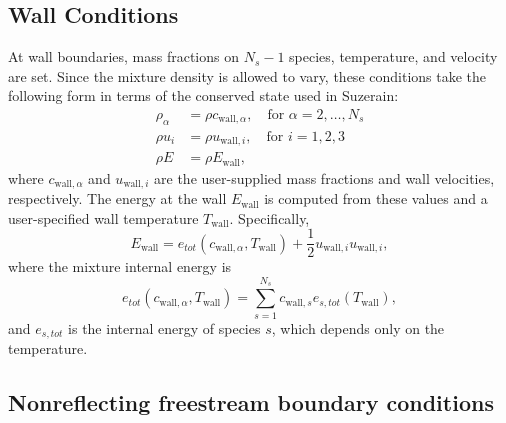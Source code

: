 

\subsection{Wall Conditions}
At wall boundaries, mass fractions on $N_s -1$ species, temperature,
and velocity are set.  Since the mixture density is allowed to vary,
these conditions take the following form in terms of the conserved
state used in Suzerain:
%
\begin{align*}
\rho_{\alpha} &= \rho c_{\mathrm{wall},\alpha}, \quad \mathrm{for} \,\, \alpha = 2, \ldots, N_s\\
\rho u_i &= \rho u_{\mathrm{wall},i}, \quad \mathrm{for} \,\, i = 1, 2, 3 \\
\rho E &= \rho E_{\mathrm{wall}},
\end{align*}
%
where $c_{\mathrm{wall},\alpha}$ and $u_{\mathrm{wall},i}$ are the user-supplied
mass fractions and wall velocities, respectively.  The energy at the
wall $E_{\mathrm{wall}}$ is computed from these values and a
user-specified wall temperature $T_{\mathrm{wall}}$.  Specifically,
%
\begin{equation*}
E_{\mathrm{wall}} = e_{tot}(c_{\mathrm{wall},\alpha}, T_{\mathrm{wall}}) + \frac{1}{2} u_{\mathrm{wall},i} u_{\mathrm{wall},i},
\end{equation*}
%
where the mixture internal energy is
%
\begin{equation*}
e_{tot}(c_{\mathrm{wall},\alpha}, T_{\mathrm{wall}}) = \sum_{s=1}^{N_s} c_{\mathrm{wall},s} e_{s,tot}(T_{\mathrm{wall}}),
\end{equation*}
%
and $e_{s,tot}$ is the internal energy of species $s$, which depends
only on the temperature.  


\subsection{Nonreflecting freestream boundary conditions}
\label{sec:nonreflectingbcs}




